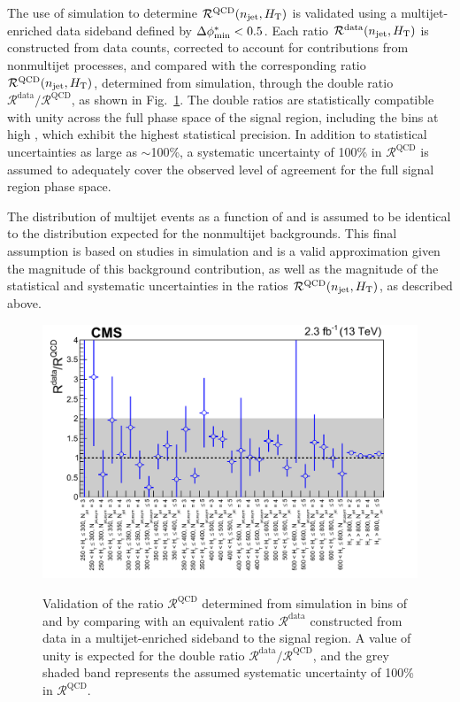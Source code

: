 The use of simulation to determine $\mathcal{R}^\mathrm{QCD}(n_{\text{jet}},
H_{\mathrm{T}})$ is validated using a multijet-enriched data sideband defined
by $\Delta\phi^{*}_\text{min} < 0.5$. Each ratio $\mathcal{R}^\text{data}(n_{\text{jet}},
H_{\mathrm{T}})$ is constructed from data counts, corrected to account for
contributions from nonmultijet processes, and compared with the
corresponding ratio $\mathcal{R}^\mathrm{QCD}(n_{\text{jet}}, H_{\mathrm{T}})$,
determined from simulation, through the double ratio
$\mathcal{R}^\text{data}/\mathcal{R}^\mathrm{QCD}$, as shown in
Fig.~\ref{fig:qcd}. The double ratios are statistically compatible
with unity across the full phase space of the signal region, including
the bins at high \scalht, which exhibit the highest statistical
precision. In addition to statistical uncertainties as large as
$\sim$100\%, a systematic uncertainty of 100\% in
$\mathcal{R}^\mathrm{QCD}$ is assumed to adequately cover the observed
level of agreement for the full signal region phase space. 

The distribution of multijet events as a function of \nb and \HTmiss
is assumed to be identical to the distribution expected for the
nonmultijet backgrounds. This final assumption is based on studies in
simulation and is a valid approximation given the magnitude of this
background contribution, as well as the magnitude of the statistical
and systematic uncertainties in the ratios
$\mathcal{R}^\mathrm{QCD}(n_{\text{jet}}, H_{\mathrm{T}})$, as described above.
 
\begin{figure}[!thb]
  \centering
    \includegraphics[width=\cmsFigWidthTwo]{Figure_002.pdf} \\
  \caption{Validation of the ratio $\mathcal{R}^\mathrm{QCD}$ determined
    from simulation in bins of \njet and \scalht [\GeVns{}] by comparing
    with an equivalent ratio $\mathcal{R}^\text{data}$ constructed
    from data in a multijet-enriched sideband to the signal region. A
    value of unity is expected for the double ratio
    $\mathcal{R}^\text{data} / \mathcal{R}^\mathrm{QCD}$, and the grey
    shaded band represents the assumed systematic uncertainty of 100\%
    in $\mathcal{R}^\mathrm{QCD}$.  }
  \label{fig:qcd}
\end{figure}

